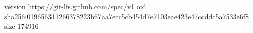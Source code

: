 version https://git-lfs.github.com/spec/v1
oid sha256:019656311266378223b67aa7ecc5cb454d7e7103eae423e47ccddc5a7533e6f8
size 174916
